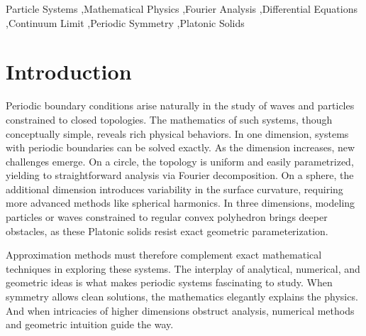 \documentclass[final,5p,times,twocolumn,authoryear]{elsarticle}
\begin{document}
\begin{frontmatter}


\begin{keyword}
Particle Systems \sep Mathematical Physics \sep Fourier Analysis \sep Differential Equations \sep Continuum Limit \sep Periodic Symmetry \sep Platonic Solids



\end{keyword}


\end{frontmatter}




\section{Introduction}
\label{introduction}
Periodic boundary conditions arise naturally in the study of waves and particles constrained to closed topologies. The mathematics of such systems, though conceptually simple, reveals rich physical behaviors. In one dimension, systems with periodic boundaries can be solved exactly. As the dimension increases, new challenges emerge. On a circle, the topology is uniform and easily parametrized, yielding to straightforward analysis via Fourier decomposition. On a sphere, the additional dimension introduces variability in the surface curvature, requiring more advanced methods like spherical harmonics. In three dimensions, modeling particles or waves constrained to regular convex polyhedron brings deeper obstacles, as these Platonic solids resist exact geometric parameterization.

Approximation methods must therefore complement exact mathematical techniques in exploring these systems. The interplay of analytical, numerical, and geometric ideas is what makes periodic systems fascinating to study. When symmetry allows clean solutions, the mathematics elegantly explains the physics. And when intricacies of higher dimensions obstruct analysis, numerical methods and geometric intuition guide the way.
\end{document}
